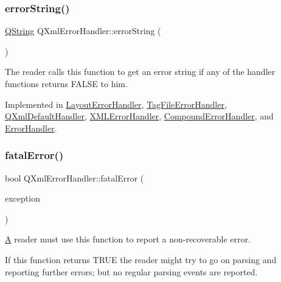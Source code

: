 \subsubsection{\texorpdfstring{errorString()}{errorString()}}
{\footnotesize\ttfamily \mbox{\hyperlink{class_q_string}{Q\+String}} Q\+Xml\+Error\+Handler\+::error\+String (\begin{DoxyParamCaption}{ }\end{DoxyParamCaption})\hspace{0.3cm}{\ttfamily [pure virtual]}}

The reader calls this function to get an error string if any of the handler functions returns F\+A\+L\+SE to him. 

Implemented in \mbox{\hyperlink{class_layout_error_handler_a042664a153147e99f4ee0cb3bdf76418}{Layout\+Error\+Handler}}, \mbox{\hyperlink{class_tag_file_error_handler_a699ed3bca495674a04d051a6a7a0b96d}{Tag\+File\+Error\+Handler}}, \mbox{\hyperlink{class_q_xml_default_handler_afcbe5fdce86cea4b7863e752c2413c45}{Q\+Xml\+Default\+Handler}}, \mbox{\hyperlink{class_x_m_l_error_handler_ac8884161fa6aa0624f42ec57b04a66bb}{X\+M\+L\+Error\+Handler}}, \mbox{\hyperlink{class_compound_error_handler_aceb61310e8c5649d6390a8dff0992caf}{Compound\+Error\+Handler}}, and \mbox{\hyperlink{class_error_handler_a193381152001d019c4155600a61c478d}{Error\+Handler}}.

\mbox{\label{class_q_xml_error_handler_aaa8c1ad1b42a5257cf2344c7fe101797}} 
\subsubsection{\texorpdfstring{fatalError()}{fatalError()}}
{\footnotesize\ttfamily bool Q\+Xml\+Error\+Handler\+::fatal\+Error (\begin{DoxyParamCaption}\item[{const \mbox{\hyperlink{class_q_xml_parse_exception}{Q\+Xml\+Parse\+Exception}} \&}]{exception }\end{DoxyParamCaption})\hspace{0.3cm}{\ttfamily [pure virtual]}}

\mbox{\hyperlink{class_a}{A}} reader must use this function to report a non-\/recoverable error.

If this function returns T\+R\+UE the reader might try to go on parsing and reporting further errors; but no regular parsing events are reported. 

